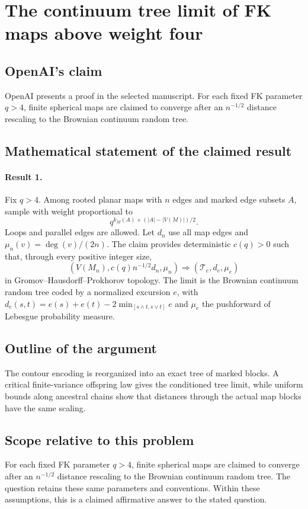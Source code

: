 \documentclass[11pt]{article}
\begin{document}
\section*{The continuum tree limit of FK maps above weight four}

\subsection{OpenAI's claim}
OpenAI presents a proof in the selected manuscript. For each fixed FK parameter $q>4$, finite spherical maps are claimed to converge after an $n^{-1/2}$ distance rescaling to the Brownian continuum random tree.

\subsection{Mathematical statement of the claimed result}
\paragraph{Result 1.} Fix \(q>4\). Among rooted planar maps with \(n\) edges and marked edge subsets \(A\), sample with weight proportional to
\[
 q^{k_M(A)+(|A|-|V(M)|)/2}.
\]
Loops and parallel edges are allowed. Let \(d_n\) use all map edges and \(\mu_n(v)=\deg(v)/(2n)\). The claim provides deterministic \(c(q)>0\) such that, through every positive integer size,
\[
 (V(M_n),c(q)n^{-1/2}d_n,\mu_n)
 \Longrightarrow(\mathcal T_e,d_e,\mu_e)
\]
in Gromov--Hausdorff--Prokhorov topology. The limit is the Brownian continuum random tree coded by a normalized excursion \(e\), with \(d_e(s,t)=e(s)+e(t)-2\min_{[s\wedge t,s\vee t]}e\) and \(\mu_e\) the pushforward of Lebesgue probability measure.

\subsection{Outline of the argument}
The contour encoding is reorganized into an exact tree of marked blocks. A critical finite-variance offspring law gives the conditioned tree limit, while uniform bounds along ancestral chains show that distances through the actual map blocks have the same scaling.

\subsection{Scope relative to this problem}
For each fixed FK parameter $q>4$, finite spherical maps are claimed to converge after an $n^{-1/2}$ distance rescaling to the Brownian continuum random tree. The question retains these same parameters and conventions. Within these assumptions, this is a claimed affirmative answer to the stated question.
\end{document}

